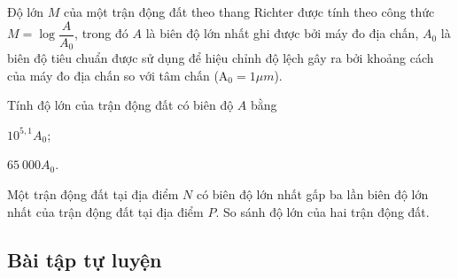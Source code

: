 \begin{vd}%
	Độ lớn $ M $ của một trận động đất theo thang Richter được tính theo công thức $ M=\log \dfrac{A}{A_0} $, trong đó $ A $ là biên độ lớn nhất ghi được bởi máy đo địa chấn, $ A_0 $ là biên độ tiêu chuẩn được sử dụng để hiệu chỉnh độ lệch gây ra bởi khoảng cách của máy đo địa chấn so với tâm chấn ($ \mathrm{A}_0=1 \mu m$).
	\begin{listEX}[1]
		\item[a)] Tính độ lớn của trận động đất có biên độ $A$ bằng
		\begin{listEX}[2]
			\item[i)] $ 10^{5{,}1}A_0 $;
			\item[ii)] $ 65~000 A_0$.  
		\end{listEX}
		\item[b)] Một trận động đất tại địa điểm $ N $ có biên độ lớn nhất gấp ba lần biên độ lớn nhất của trận động đất tại địa điểm $ P $. So sánh độ lớn của hai trận động đất.
	\end{listEX}
\end{vd} 

\subsection{Bài tập tự luyện}

